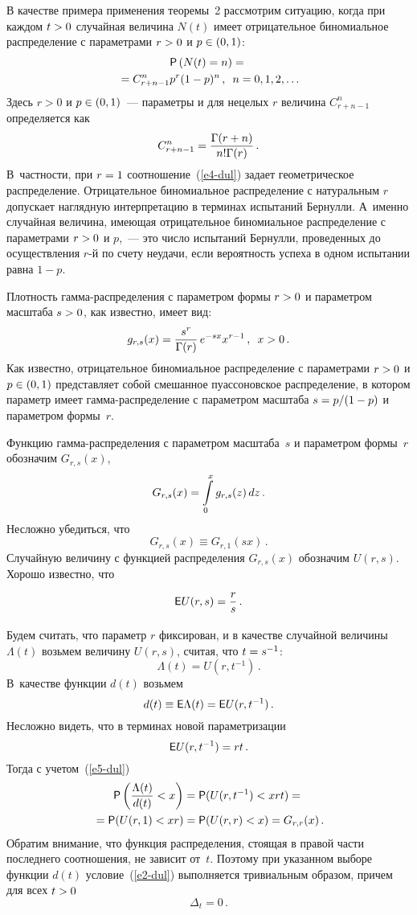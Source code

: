 \begin{multicols}{2}
В качестве примера применения теоремы~2 рассмотрим ситуацию, когда
при каждом $t\hm>0$ случайная величина $N(t)$ имеет отрицательное
биномиальное распределение с параметрами $r\hm>0$ и $p\hm\in(0,1)$:
\begin{multline}
{\sf P}\left(N(t)=n\right)={}\\
{}= C_{r+n-1}^{n}p^r(1-p)^{n}\,,\enskip
n=0,1,2,\ldots
\label{e4-dul}
\end{multline}
Здесь $r>0$ и $p\hm\in(0,1)$~--- параметры и для нецелых $r$ величина
$C_{r+n-1}^{n}$ определяется как 
$$ 
C_{r+n-1}^{n} = \displaystyle\frac{\displaystyle \Gamma(r+n)\mathstrut}{\displaystyle n!\Gamma(r)\mathstrut}\,. 
$$ 
В~частности, при $r\hm=1$
соотношение~(\ref{e4-dul}) задает геометрическое распределение. Отрицательное
биномиальное распределение с натуральным $r$ допускает наглядную
интерпретацию в терминах испытаний Бернулли. А~именно случайная
величина, име\-ющая отрицательное биномиальное распределение с
параметрами $r\hm>0$ и $p$,~--- это число испытаний Бернулли,
проведенных до осуществления $r$-й по счету неудачи, если
вероятность успеха в одном испытании равна $1-p$.

Плотность гамма-распределения с параметром формы $r\hm>0$ и параметром
масштаба $s\hm>0$, как известно, имеет вид:
$$
g_{r,s}(x)=\displaystyle\frac{\displaystyle s^r\mathstrut}{\displaystyle \Gamma(r)\mathstrut}\,e^{-s x}x^{r-1}\,,\enskip x>0\,.
$$
Как известно, отрицательное биномиальное распределение с параметрами
$r\hm>0$ и $p\hm\in(0,1)$ представ\-ля\-ет собой смешанное пуассоновское
распределение, в котором параметр имеет гам\-ма-рас\-пре\-де\-ле\-ние с
параметром масштаба $s\hm=p/(1\hm-p)$ и параметром формы~$r$.

Функцию гамма-распределения с параметром масштаба~$s$ и параметром
формы~$r$ обозначим $G_{r,s}(x)$,
$$
G_{r,s}(x)=\int\limits_{0}^{x}g_{r,s}(z)\,dz\,.
$$
Несложно убедиться, что
\begin{equation}
G_{r,s}(x)\equiv G_{r,1}(s x)\,.
\label{e5-dul}
\end{equation}
Случайную величину с функцией распределения $G_{r,s}(x)$ обозначим
$U(r,s)$. Хорошо известно, что 
$$
{\sf E}U(r,s)=\displaystyle\frac{\displaystyle r\mathstrut}{\displaystyle s\mathstrut}\,.
$$

Будем считать, что параметр $r$ фиксирован, и в качестве случайной
величины $\Lambda(t)$ возьмем величину $U(r,s)$, считая, что
$t\hm=s^{-1}$: 
$$
\Lambda(t)=U(r,t^{-1})\,.
$$ 
В~качестве функции $d(t)$
возьмем 
$$
d(t)\equiv{\sf E}\Lambda(t)={\sf E}U(r,t^{-1})\,.
$$ 
Несложно видеть, что в терминах новой параметризации 
$$
{\sf E}U(r,t^{-1})=rt\,.
$$ 
Тогда с учетом~(\ref{e5-dul}) 
\begin{multline*}
{\sf P}\left(\displaystyle\frac{\displaystyle \Lambda(t)\mathstrut}{\displaystyle d(t)\mathstrut}<x\right)={\sf P}(U(r,t^{-1})<xrt)={}\\
{}=
{\sf P}(U(r,1)<xr)={\sf
P}(U(r,r)<x)=G_{r,r}(x)\,.
\end{multline*}
Обратим внимание, что функция
распределения, стоящая в правой части последнего соотношения, не
зависит от~$t$. Поэтому при указанном выборе функции $d(t)$ условие~(\ref{e2-dul}) 
выполняется тривиальным образом, причем для всех $t\hm>0$
$$
\Delta_t=0\,.
$$


\end{multicols}
